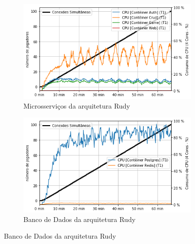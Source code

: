 \begin{figure}[htb!]
    \caption{Consumo de \ac{cpu} das arquiteturas}
    \label{fig:experimento_cpu}

    \begin{subfigure}{.5\textwidth}
        \centering
        \includegraphics[width=.95\linewidth]{figuras/testes/r_cpu_game.png}
        \caption{Microsserviços da arquitetura Rudy}
        \label{fig:r_cpu_game}
    \end{subfigure}%
    \begin{subfigure}{.5\textwidth}
        \centering
        \includegraphics[width=.95\linewidth]{figuras/testes/r_cpu_db.png}
        \caption{Banco de Dados da arquitetura Rudy}
        \label{fig:r_cpu_db}
    \end{subfigure}%


\end{figure}
